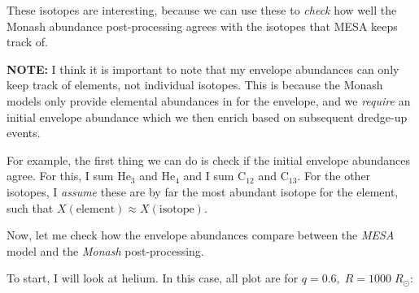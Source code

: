 \documentclass[a4paper,10pt]{article}
\begin{document}
These isotopes are interesting, because we can use these to \emph{check} how well the Monash abundance post-processing agrees with the isotopes that MESA keeps track of.

\begin{questionbox}{}{}
\textbf{\textcolor{keywordscolor}{NOTE:}}
    I think it is important to note that my envelope abundances can only keep track of elements, not individual isotopes. This is because the Monash models only provide elemental abundances in for the envelope, and we \emph{require} an initial envelope abundance which we then enrich based on subsequent dredge-up events.
\end{questionbox}

For example, the first thing we can do is check if the initial envelope abundances agree. For this, I sum \(\text{He}_{3}\) and \(\text{He}_{4}\) and I sum \(\text{C}_{12}\) and \(\text{C}_{13}\). For the other isotopes, I \emph{assume} these are by far the most abundant isotope for the element, such that \(X(\text{element} ) \approx X(\text{isotope} )\).

\begin{figure}[ht]
    \centering
\end{figure}

Now, let me check how the envelope abundances compare between the \emph{MESA} model and the \emph{Monash} post-processing.

To start, I will look at helium. In this case, all plot are for \(q=0.6,\; R=1000\; R_\odot \):

\begin{figure}[ht]
    \centering
\end{figure}
\end{document}
